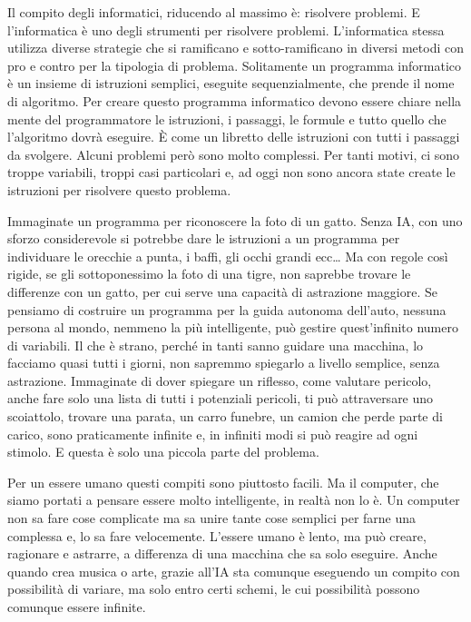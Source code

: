 \documentclass[12pt]{book} %
\begin{document}
Il compito degli informatici, riducendo al massimo è: risolvere problemi. E l'informatica è uno
degli strumenti per risolvere problemi. L'informatica stessa utilizza diverse strategie che si
ramificano e sotto-ramificano in diversi metodi con pro e contro per la tipologia di problema. Solitamente un programma
informatico è un insieme di istruzioni semplici, eseguite sequenzialmente, che prende il nome di algoritmo. Per creare
questo programma informatico devono essere chiare nella mente del programmatore le istruzioni, i passaggi, le formule e
tutto quello che l'algoritmo dovrà eseguire. È come un libretto delle istruzioni con tutti i
passaggi da svolgere. Alcuni problemi però sono molto complessi. Per tanti motivi, ci sono troppe variabili, troppi
casi particolari e, ad oggi non sono ancora state create le istruzioni per risolvere questo problema. 

Immaginate un programma per riconoscere la foto di un gatto. Senza IA, con uno sforzo considerevole si potrebbe dare le
istruzioni a un programma per individuare le orecchie a punta, i baffi, gli occhi grandi ecc… Ma con regole così
rigide, se gli sottoponessimo la foto di una tigre, non saprebbe trovare le differenze con un gatto, per cui serve una
capacità di astrazione maggiore. Se pensiamo di costruire un programma per la guida autonoma
dell'auto, nessuna persona al mondo, nemmeno la più intelligente, può gestire
quest'infinito numero di variabili. Il che è strano, perché in tanti sanno guidare una macchina,
lo facciamo quasi tutti i giorni, non sapremmo spiegarlo a livello semplice, senza astrazione. Immaginate di dover spiegare
un riflesso, come valutare pericolo, anche fare solo una lista di tutti i potenziali pericoli, ti può attraversare uno
scoiattolo, trovare una parata, un carro funebre, un camion che perde parte di carico, sono praticamente infinite e, in
infiniti modi si può reagire ad ogni stimolo. E questa è solo una piccola parte del problema. 

Per un essere umano questi compiti sono piuttosto facili. Ma il computer, che siamo portati a pensare essere molto
intelligente, in realtà non lo è. Un computer non sa fare cose complicate ma sa unire tante cose semplici per farne una
complessa e, lo sa fare velocemente. L'essere umano è lento, ma può creare, ragionare e astrarre,
a differenza di una macchina che sa solo eseguire. Anche quando crea musica o arte, grazie all'IA
sta comunque eseguendo un compito con possibilità di variare, ma solo entro certi schemi, le cui possibilità possono
comunque essere infinite.
\end{document}

